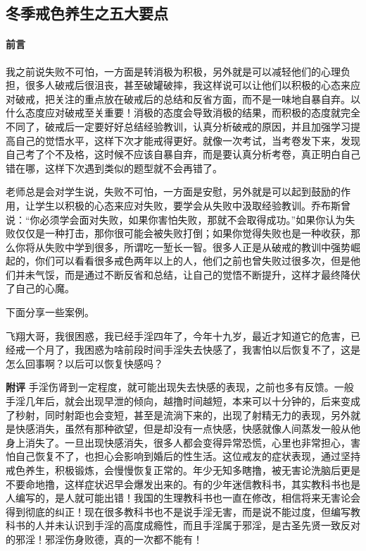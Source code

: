 \subsection{冬季戒色养生之五大要点}

\paragraph*{前言}

我之前说失败不可怕，一方面是转消极为积极，另外就是可以减轻他们的心理负担，很多人破戒后很沮丧，甚至破罐破摔，我这样说可以让他们以积极的心态来应对破戒，把关注的重点放在破戒后的总结和反省方面，而不是一味地自暴自弃。以什么态度应对破戒至关重要！消极的态度会导致消极的结果，而积极的态度就完全不同了，破戒后一定要好好总结经验教训，认真分析破戒的原因，并且加强学习提高自己的觉悟水平，这样下次才能戒得更好。就像一次考试，当考卷发下来，发现自己考了个不及格，这时候不应该自暴自弃，而是要认真分析考卷，真正明白自己错在哪，这样下次遇到类似的题型就不会再错了。

老师总是会对学生说，失败不可怕，一方面是安慰，另外就是可以起到鼓励的作用，让学生以积极的心态来应对失败，要学会从失败中汲取经验教训。乔布斯曾说：“你必须学会面对失败，如果你害怕失败，那就不会取得成功。”如果你认为失败仅仅是一种打击，那你很可能会被失败打倒；如果你觉得失败也是一种收获，那么你将从失败中学到很多，所谓吃一堑长一智。很多人正是从破戒的教训中强势崛起的，你们可以看看很多戒色两年以上的人，他们之前也曾失败过很多次，但是他们并未气馁，而是通过不断反省和总结，让自己的觉悟不断提升，这样才最终降伏了自己的心魔。

下面分享一些案例。

\begin{case}
    飞翔大哥，我很困惑，我已经手淫四年了，今年十九岁，最近才知道它的危害，已经戒一个月了，我困惑为啥前段时间手淫失去快感了，我害怕以后恢复不了，这是怎么回事啊？以后可以恢复快感吗？

    \textbf{附评} 手淫伤肾到一定程度，就可能出现失去快感的表现，之前也多有反馈。一般手淫几年后，就会出现早泄的倾向，越撸时间越短，本来可以十分钟的，后来变成了秒射，同时射距也会变短，甚至是流淌下来的，出现了射精无力的表现，另外就是快感消失，虽然有那种欲望，但是却没有一点快感，快感就像人间蒸发一般从他身上消失了。一旦出现快感消失，很多人都会变得异常恐慌，心里也非常担心，害怕自己恢复不了，也担心会影响到婚后的性生活。这位戒友的症状表现，通过坚持戒色养生，积极锻炼，会慢慢恢复正常的。年少无知多瞎撸，被无害论洗脑后更是不要命地撸，这样症状迟早会爆发出来的。有的少年迷信教科书，其实教科书也是人编写的，是人就可能出错！我国的生理教科书也一直在修改，相信将来无害论会得到彻底的纠正！现在很多教科书也不是说手淫无害，而是说不能过度，但编写教科书的人并未认识到手淫的高度成瘾性，而且手淫属于邪淫，是古圣先贤一致反对的邪淫！邪淫伤身败德，真的一次都不能有！
\end{case}

